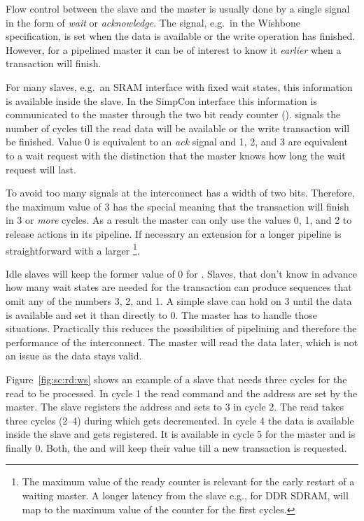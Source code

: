 Flow control between the slave and the master is usually done by a
single signal in the form of \emph{wait} or \emph{acknowledge}. The
 signal, e.g.\ in the Wishbone specification, is set when
the data is available or the write operation has finished. However,
for a pipelined master it can be of interest to know it
\emph{earlier} when a transaction will finish.


For many slaves, e.g.\ an SRAM interface with fixed wait states,
this information is available inside the slave. In the SimpCon
interface this information is communicated to the master through the
two bit ready counter ().  signals the
number of cycles till the read data will be available or the write
transaction will be finished. Value 0 is equivalent to an \emph{ack}
signal and 1, 2, and 3 are equivalent to a wait request with the
distinction that the master knows how long the wait request will
last.

To avoid too many signals at the interconnect  has a
width of two bits. Therefore, the maximum value of 3 has the special
meaning that the transaction will finish in 3 or \emph{more} cycles.
As a result the master can only use the values 0, 1, and 2 to
release actions in its pipeline. If necessary an extension for a
longer pipeline is straightforward with a larger
\footnote{The maximum value of the ready counter is
relevant for the early restart of a waiting master. A longer latency
from the slave e.g., for DDR SDRAM, will map to the maximum value of
the counter for the first cycles.}.

Idle slaves will keep the former value of 0 for .
Slaves, that don't know in advance how many wait states are needed
for the transaction can produce sequences that omit any of the
numbers 3, 2, and 1. A simple slave can hold  on 3
until the data is available and set it than directly to 0. The
master has to handle those situations. Practically this reduces the
possibilities of pipelining and therefore the performance of the
interconnect. The master will read the data later, which is not an
issue as the data stays valid.

Figure~\ref{fig:sc:rd:ws} shows an example of a slave that needs
three cycles for the read to be processed. In cycle 1 the read
command and the address are set by the master. The slave registers
the address and sets  to 3 in cycle 2. The read takes
three cycles (2--4) during which  gets decremented.
In cycle 4 the data is available inside the slave and gets
registered. It is available in cycle 5 for the master and
 is finally 0. Both, the  and
 will keep their value till a new transaction is
requested.


